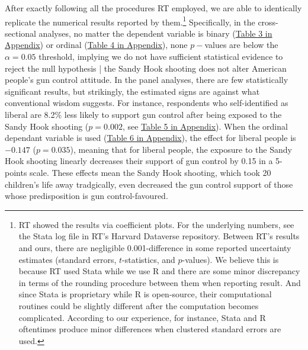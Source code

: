 \documentclass[11pt]{article}
\begin{document}
After exactly following all the procedures RT employed, we are able to identically replicate the numerical results reported by them.\footnote{RT showed the results via coefficient plots. For the underlying numbers, see the Stata log file in RT’s Harvard Dataverse repository. Between RT’s results and ours, there are negligible 0.001-difference in some reported uncertainty estimates (standard errors, \(t\)-statistics, and \(p\)-values). We believe this is because RT used Stata while we use R and there are some minor discrepancy in terms of the rounding procedure between them when reporting result. And since Stata is proprietary while R is open-source, their computational routines could be slightly different after the computation becomes complicated. According to our experience, for instance, Stata and R oftentimes produce minor differences when clustered standard errors are used.} Specifically, in the cross-sectional analyses, no matter the dependent variable is binary (\hyperref[atab1]{Table 3 in Appendix}) or ordinal (\hyperref[atab2]{Table 4 in Appendix}), none \(p-\)values are below the \(\alpha = 0.05\) threshold, implying we do not have sufficient statistical evidence to reject the null hypothesis | the Sandy Hook shooting does not alter American people’s gun control attitude. In the panel analyses, there are few statistically significant results, but strikingly, the estimated signs are against what conventional wisdom suggests. For instance, respondents who self-identified as liberal are 8.2\% less likely to support gun control after being exposed to the Sandy Hook shooting (\(p = 0.002\), see \hyperref[atab3]{Table 5 in Appendix}). When the ordinal dependant variable is used (\hyperref[atab4]{Table 6 in Appendix}), the effect for liberal people is \(-0.147\) (\(p = 0.035\)), meaning that for liberal people, the exposure to the Sandy Hook shooting linearly decreases their support of gun control by 0.15 in a 5-points scale. These effects mean the Sandy Hook shooting, which took 20 children’s life away tradgically, even decreased the gun control support of those whose predisposition is gun control-favoured.
\end{document}
